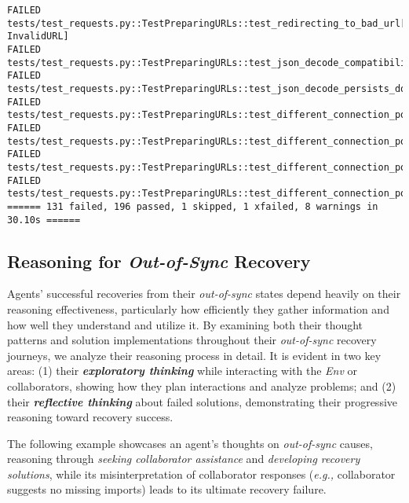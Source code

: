 \begin{Verbatim}[fontsize=\small, breaklines=true, breakanywhere=true]
FAILED tests/test_requests.py::TestPreparingURLs::test_redirecting_to_bad_url[http://:1-InvalidURL]
FAILED tests/test_requests.py::TestPreparingURLs::test_json_decode_compatibility
FAILED tests/test_requests.py::TestPreparingURLs::test_json_decode_persists_doc_attr
FAILED tests/test_requests.py::TestPreparingURLs::test_different_connection_pool_for_tls_settings_verify_True
FAILED tests/test_requests.py::TestPreparingURLs::test_different_connection_pool_for_tls_settings_verify_bundle_expired_cert
FAILED tests/test_requests.py::TestPreparingURLs::test_different_connection_pool_for_tls_settings_verify_bundle_unexpired_cert
FAILED tests/test_requests.py::TestPreparingURLs::test_different_connection_pool_for_mtls_settings
====== 131 failed, 196 passed, 1 skipped, 1 xfailed, 8 warnings in 30.10s ======
\end{Verbatim}



\subsection{Reasoning for \textit{Out-of-Sync} Recovery}

Agents' successful recoveries from their \textit{out-of-sync} states depend heavily on their reasoning effectiveness, particularly how efficiently they gather information and how well they understand and utilize it.
By examining both their thought patterns and solution implementations throughout their \textit{out-of-sync} recovery journeys, we analyze their reasoning process in detail.
It is evident in two key areas: (1) their \textbf{\textit{exploratory thinking}} while interacting with the \textit{Env} or collaborators, showing how they plan interactions and analyze problems; and (2) their \textbf{\textit{reflective thinking}} about failed solutions, demonstrating their progressive reasoning toward recovery success.

The following example showcases an agent's thoughts on \textit{out-of-sync} causes, reasoning through \textcolor{fig2_ask}{\textit{seeking collaborator assistance}} and \textcolor{fig2_code}{\textit{developing recovery solutions}}, while its misinterpretation of collaborator responses (\textit{e.g.,} collaborator suggests no missing imports) leads to its ultimate recovery failure.

